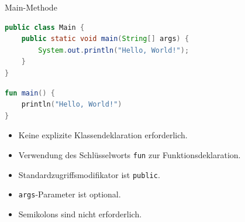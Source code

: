 \documentclass{beamer}
\begin{document}
\begin{frame}[fragile]{Main-Methode}
  \begin{lstlisting}[language=Java, title=Java Main-Methode, xleftmargin=1em]
public class Main {
    public static void main(String[] args) {
        System.out.println("Hello, World!");
    }
}
  \end{lstlisting}
  \pause\vspace{0cm}
  \begin{lstlisting}[language=Kotlin, title=Kotlin Main-Methode, xleftmargin=1em]
fun main() {
    println("Hello, World!")
}
  \end{lstlisting}
    \pause\vspace{0cm}
    \begin{itemize}[<+->]
      \item Keine explizite Klassendeklaration erforderlich. %
      \item Verwendung des Schlüsselworts \texttt{fun} zur Funktionsdeklaration.
      \item Standardzugriffsmodifikator ist \texttt{public}.
      \item \texttt{args}-Parameter ist optional.
      \item Semikolons sind nicht erforderlich.
    \end{itemize}
    \vspace{1cm}
\end{frame}
\end{document}
